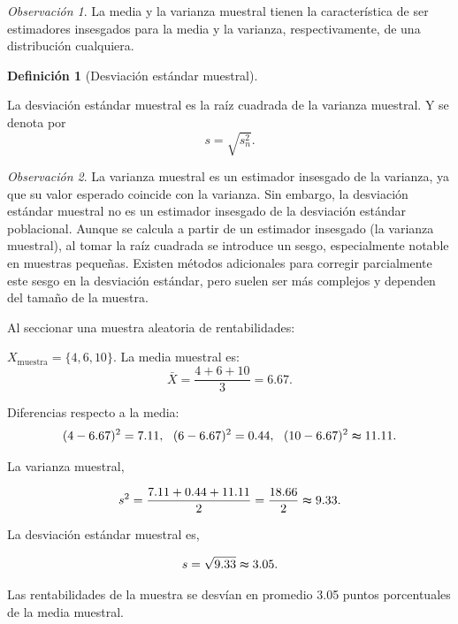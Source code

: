 \documentclass[
  us-letterpaper,
]{scrreprt}
\theoremstyle{plain}
\theoremstyle{definition}
\newtheorem{definition}{Definición}[chapter]
\theoremstyle{definition}
\theoremstyle{remark}
\newtheorem*{remark}{Observación}
\begin{document}
\begin{remark}
La media y la varianza muestral tienen la característica de ser
estimadores insesgados para la media y la varianza, respectivamente, de
una distribución cualquiera.
\end{remark}

\begin{definition}[Desviación estándar
muestral]\protect\hypertarget{def-sdm}{}\label{def-sdm}

La desviación estándar muestral es la raíz cuadrada de la varianza
muestral. Y se denota por \[s = \sqrt{s_n^2}. \]

\end{definition}

\begin{remark}
La varianza muestral es un estimador insesgado de la varianza, ya que su
valor esperado coincide con la varianza. Sin embargo, la desviación
estándar muestral no es un estimador insesgado de la desviación estándar
poblacional. Aunque se calcula a partir de un estimador insesgado (la
varianza muestral), al tomar la raíz cuadrada se introduce un sesgo,
especialmente notable en muestras pequeñas. Existen métodos adicionales
para corregir parcialmente este sesgo en la desviación estándar, pero
suelen ser más complejos y dependen del tamaño de la muestra.
\end{remark}

\begin{tcolorbox}[enhanced jigsaw, colback=white, toptitle=1mm, arc=.35mm, rightrule=.15mm, left=2mm, colframe=quarto-callout-caution-color-frame, breakable, leftrule=.75mm, colbacktitle=quarto-callout-caution-color!10!white, coltitle=black, opacityback=0, bottomtitle=1mm, bottomrule=.15mm, titlerule=0mm, opacitybacktitle=0.6, toprule=.15mm, title={\textbf{Análisis de Rentabilidades Anuales}}]

Al seccionar una muestra aleatoria de rentabilidades:

\(X_\text{muestra} = \{4,6,10 \}.\) La media muestral es:
\[\bar{X} = \dfrac{4 + 6 + 10}{3} =  6.67.\]

Diferencias respecto a la media:
\[(4- 6.67)^2 = 7.11, \ \ (6- 6.67)^2 = 0.44, \ \ (10- 6.67)^2 \thickapprox  11.11.\]

La varianza muestral,

\[s^2 = \dfrac{7.11 + 0.44 + 11.11 }{ 2} =  \frac{18.66 }{2} \thickapprox 9.33 .\]

La desviación estándar muestral es,

\[ s = \sqrt{9.33} \thickapprox 3.05 .\]

Las rentabilidades de la muestra se desvían en promedio 3.05 puntos
porcentuales de la media muestral.

\end{tcolorbox}
\end{document}
